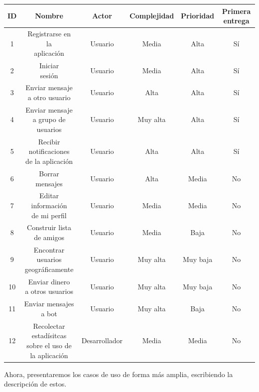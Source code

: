 \begin{center}
\begin{tabular}{|c|c|c|c|c|c|}
\hline
ID & Nombre & Actor & Complejidad & Prioridad & Primera entrega \\
\hline
1 & \makecell{Registrarse en la\\ aplicación} & Usuario & Media & Alta & Sí \\
\hline
2 & \makecell{Iniciar\\ sesión} & Usuario & Media & Alta & Sí \\
\hline
3 & \makecell{Enviar mensaje\\ a otro usuario} & Usuario & Alta & Alta & Sí \\
\hline
4 & \makecell{Enviar mensaje\\ a grupo de usuarios} & Usuario & Muy alta & Alta & Sí \\
\hline
5 & \makecell{Recibir notificaciones\\ de la aplicación} & Usuario & Alta & Alta & Sí \\
\hline
6 & \makecell{Borrar \\mensajes} & Usuario & Alta & Media & No \\
\hline
7 & \makecell{Editar información\\ de mi perfil} & Usuario & Media & Media & No \\
\hline
8 & \makecell{Construir lista\\ de amigos} & Usuario & Media & Baja & No \\
\hline
9 & \makecell{Encontrar usuarios\\ geográficamente} & Usuario & Muy alta & Muy
baja & No \\
\hline
10 & \makecell{Enviar dinero\\ a otros usuarios} & Usuario & Muy alta & Muy baja & No \\
\hline
11 & \makecell{Enviar mensajes\\ a bot} & Usuario & Muy alta & Baja & No \\
\hline
12 &  \makecell{Recolectar estadísitcas\\ sobre el uso de la aplicación} & Desarrollador & Media & Media & No\\
\hline
\end{tabular}
\end{center}

Ahora, presentaremos los casos de uso de forma más amplia, escribiendo la descripción de estos.

